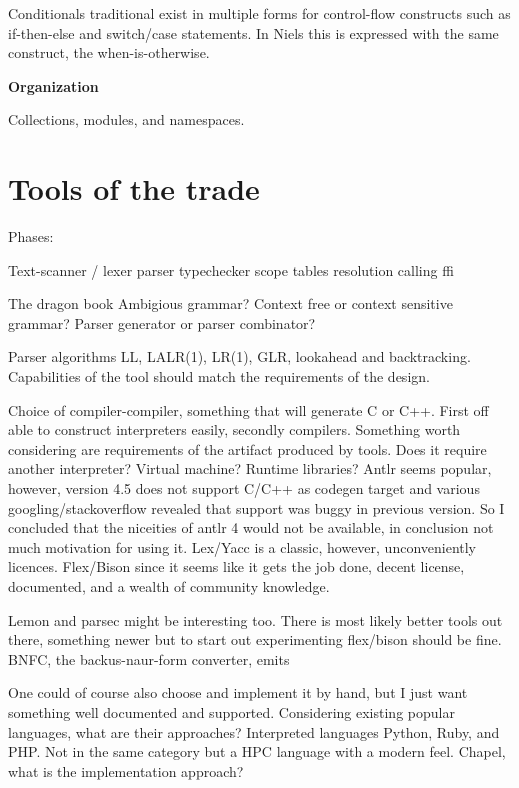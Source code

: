 \documentclass{sigplanconf}
\begin{document}
Conditionals traditional exist in multiple forms for control-flow constructs such as if-then-else and switch/case statements. In Niels this is expressed with the same construct, the when-is-otherwise.

\textbf{Organization}

Collections, modules, and namespaces.

\section{Tools of the trade}

Phases:

Text-scanner / lexer
parser
typechecker
scope tables
resolution
calling
ffi

The dragon book
Ambigious grammar?
Context free or context sensitive grammar?
Parser generator or parser combinator?

Parser algorithms LL, LALR(1), LR(1), GLR, lookahead and backtracking.
Capabilities of the tool should match the requirements of the design.

Choice of compiler-compiler, something that will generate C or C++.
First off able to construct interpreters easily, secondly compilers.
Something worth considering are requirements of the artifact produced by tools.
Does it require another interpreter? Virtual machine? Runtime libraries?
Antlr\cite{cc:antlr} seems popular, however, version 4.5 does not support C/C++ as codegen target and various googling/stackoverflow revealed that support was buggy in previous version.
So I concluded that the niceities of antlr 4 would not be available, in conclusion not much motivation for using it.
Lex\cite{cc:lex}/Yacc\cite{cc:yacc} is a classic, however, unconveniently licences.
Flex/Bison since it seems like it gets the job done, decent license, documented, and a wealth of community knowledge.

Lemon\cite{cc:lemon} and parsec\cite{cc:parsec} might be interesting too.
There is most likely better tools out there, something newer but to start out experimenting flex/bison should be fine.
BNFC, the backus-naur-form converter, emits

One could of course also choose and implement it by hand, but I just want something well documented and supported.
Considering existing popular languages, what are their approaches? Interpreted languages Python, Ruby, and PHP. Not in the same category but a HPC language with a modern feel. Chapel, what is the implementation approach?
\end{document}
